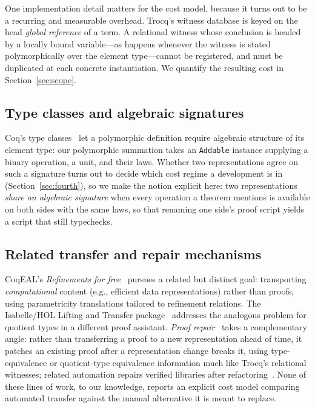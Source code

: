 \documentclass[runningheads]{llncs}
\begin{document}
One implementation detail matters for the cost model, because it turns out to
be a recurring and measurable overhead. Trocq's witness database is keyed on
the head \emph{global reference} of a term. A relational witness whose
conclusion is headed by a locally bound variable---as happens whenever the
witness is stated polymorphically over the element type---cannot be
registered, and must be duplicated at each concrete instantiation. We
quantify the resulting cost in Section~\ref{sec:scope}.

\subsection{Type classes and algebraic signatures}
Coq's type classes~\cite{sozeau2008first} let a polymorphic definition
require algebraic structure of its element type: our polymorphic summation
takes an \texttt{Addable} instance supplying a binary operation, a unit, and
their laws. Whether two representations agree on such a signature turns out
to decide which cost regime a development is in
(Section~\ref{sec:fourth}), so we make the notion explicit here: two
representations \emph{share an algebraic signature} when every operation a
theorem mentions is available on both sides with the same laws, so that
renaming one side's proof script yields a script that still typechecks.

\subsection{Related transfer and repair mechanisms}
CoqEAL's \emph{Refinements for free}~\cite{cohen2013refinements} pursues a
related but distinct goal: transporting \emph{computational} content
(e.g., efficient data representations) rather than proofs, using
parametricity translations tailored to refinement relations. The
Isabelle/HOL Lifting and Transfer package~\cite{huffman2013lifting}
addresses the analogous problem for quotient types in a different proof
assistant. \emph{Proof repair}~\cite{ringer2018proof,ringer2021proofrepair,viola2025proof}
takes a complementary angle: rather than transferring a proof to a new
representation ahead of time, it patches an existing proof after a
representation change breaks it, using type-equivalence or quotient-type
equivalence information much like Trocq's relational witnesses; related
automation repairs verified libraries after
refactoring~\cite{gopinathan2023mostly}. None of these lines of work, to our
knowledge, reports an explicit cost model comparing automated transfer
against the manual alternative it is meant to replace.
\end{document}
